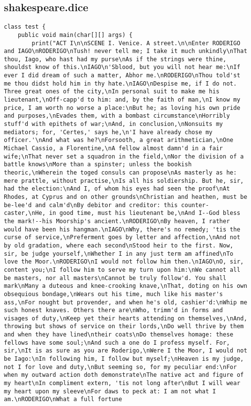 \subsection{shakespeare.dice}
\begin{verbatim}
class test {
	public void main(char[][] args) {
		print("ACT I\n\nSCENE I. Venice. A street.\n\nEnter RODERIGO and IAGO\nRODERIGO\nTush! never tell me; I take it much unkindly\nThat thou, Iago, who hast had my purse\nAs if the strings were thine, shouldst know of this.\nIAGO\n'Sblood, but you will not hear me:\nIf ever I did dream of such a matter, Abhor me.\nRODERIGO\nThou told'st me thou didst hold him in thy hate.\nIAGO\nDespise me, if I do not. Three great ones of the city,\nIn personal suit to make me his lieutenant,\nOff-capp'd to him: and, by the faith of man,\nI know my price, I am worth no worse a place:\nBut he; as loving his own pride and purposes,\nEvades them, with a bombast circumstance\nHorribly stuff'd with epithets of war;\nAnd, in conclusion,\nNonsuits my mediators; for, 'Certes,' says he,\n'I have already chose my officer.'\nAnd what was he?\nForsooth, a great arithmetician,\nOne Michael Cassio, a Florentine,\nA fellow almost damn'd in a fair wife;\nThat never set a squadron in the field,\nNor the division of a battle knows\nMore than a spinster; unless the bookish theoric,\nWherein the toged consuls can propose\nAs masterly as he: mere prattle, without practise,\nIs all his soldiership. But he, sir, had the election:\nAnd I, of whom his eyes had seen the proof\nAt Rhodes, at Cyprus and on other grounds\nChristian and heathen, must be be-lee'd and calm'd\nBy debitor and creditor: this counter-caster,\nHe, in good time, must his lieutenant be,\nAnd I--God bless the mark!--his Moorship's ancient.\nRODERIGO\nBy heaven, I rather would have been his hangman.\nIAGO\nWhy, there's no remedy; 'tis the curse of service,\nPreferment goes by letter and affection,\nAnd not by old gradation, where each second\nStood heir to the first. Now, sir, be judge yourself,\nWhether I in any just term am affined\nTo love the Moor.\nRODERIGO\nI would not follow him then.\nIAGO\nO, sir, content you;\nI follow him to serve my turn upon him:\nWe cannot all be masters, nor all masters\nCannot be truly follow'd. You shall mark\nMany a duteous and knee-crooking knave,\nThat, doting on his own obsequious bondage,\nWears out his time, much like his master's ass,\nFor nought but provender, and when he's old, cashier'd:\nWhip me such honest knaves. Others there are\nWho, trimm'd in forms and visages of duty,\nKeep yet their hearts attending on themselves,\nAnd, throwing but shows of service on their lords,\nDo well thrive by them and when they have lined\ntheir coats\nDo themselves homage: these fellows have some soul;\nAnd such a one do I profess myself. For, sir,\nIt is as sure as you are Roderigo,\nWere I the Moor, I would not be Iago:\nIn following him, I follow but myself;\nHeaven is my judge, not I for love and duty,\nBut seeming so, for my peculiar end:\nFor when my outward action doth demonstrate\nThe native act and figure of my heart\nIn compliment extern, 'tis not long after\nBut I will wear my heart upon my sleeve\nFor daws to peck at: I am not what I am.\nRODERIGO\nWhat a full fortune 
\end{verbatim}
